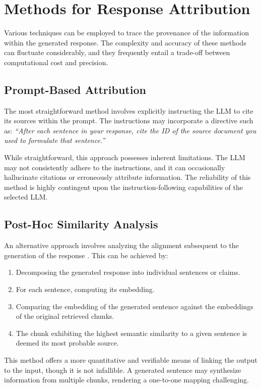 \section{Methods for Response Attribution}
Various techniques can be employed to trace the provenance of the information within the generated response. The complexity and accuracy of these methods can fluctuate considerably, and they frequently entail a trade-off between computational cost and precision.

\subsection{Prompt-Based Attribution}
The most straightforward method involves explicitly instructing the LLM to cite its sources within the prompt. The instructions may incorporate a directive such as: \textit{\enquote{After each sentence in your response, cite the ID of the source document you used to formulate that sentence.}} \autocite{gao2024retrievalaugmentedgenerationlargelanguage}

While straightforward, this approach possesses inherent limitations. The LLM may not consistently adhere to the instructions, and it can occasionally hallucinate citations or erroneously attribute information. The reliability of this method is highly contingent upon the instruction-following capabilities of the selected LLM.

\subsection{Post-Hoc Similarity Analysis}
An alternative approach involves analyzing the alignment subsequent to the generation of the response \autocite{gao2024retrievalaugmentedgenerationlargelanguage}. This can be achieved by:
\begin{enumerate}
    \item Decomposing the generated response into individual sentences or claims.
    \item For each sentence, computing its embedding.
    \item Comparing the embedding of the generated sentence against the embeddings of the original retrieved chunks.
    \item The chunk exhibiting the highest semantic similarity to a given sentence is deemed its most probable source.
\end{enumerate}
This method offers a more quantitative and verifiable means of linking the output to the input, though it is not infallible. A generated sentence may synthesize information from multiple chunks, rendering a one-to-one mapping challenging.

